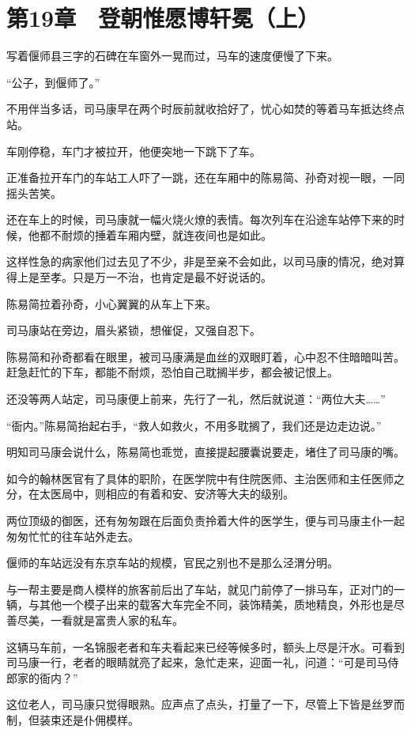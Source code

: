 \section{第19章　登朝惟愿博轩冕（上）}

写着偃师县三字的石碑在车窗外一晃而过，马车的速度便慢了下来。

“公子，到偃师了。”

不用伴当多话，司马康早在两个时辰前就收拾好了，忧心如焚的等着马车抵达终点站。

车刚停稳，车门才被拉开，他便突地一下跳下了车。

正准备拉开车门的车站工人吓了一跳，还在车厢中的陈易简、孙奇对视一眼，一同摇头苦笑。

还在车上的时候，司马康就一幅火烧火燎的表情。每次列车在沿途车站停下来的时候，他都不耐烦的捶着车厢内壁，就连夜间也是如此。

这样性急的病家他们过去见了不少，非是至亲不会如此，以司马康的情况，绝对算得上是至孝。只是万一不治，也肯定是最不好说话的。

陈易简拉着孙奇，小心翼翼的从车上下来。

司马康站在旁边，眉头紧锁，想催促，又强自忍下。

陈易简和孙奇都看在眼里，被司马康满是血丝的双眼盯着，心中忍不住暗暗叫苦。赶急赶忙的下车，都能不耐烦，恐怕自己耽搁半步，都会被记恨上。

还没等两人站定，司马康便上前来，先行了一礼，然后就说道：“两位大夫……”

“衙内。”陈易简抬起右手，“救人如救火，不用多耽搁了，我们还是边走边说。”

明知司马康会说什么，陈易简也乖觉，直接提起腰囊说要走，堵住了司马康的嘴。

如今的翰林医官有了具体的职阶，在医学院中有住院医师、主治医师和主任医师之分，在太医局中，则相应的有着和安、安济等大夫的级别。

两位顶级的御医，还有匆匆跟在后面负责拎着大件的医学生，便与司马康主仆一起匆匆忙忙的往车站外走去。

偃师的车站远没有东京车站的规模，官民之别也不是那么泾渭分明。

与一帮主要是商人模样的旅客前后出了车站，就见门前停了一排马车，正对门的一辆，与其他一个模子出来的载客大车完全不同，装饰精美，质地精良，外形也是尽善尽美，一看就是富贵人家的私车。

这辆马车前，一名锦服老者和车夫看起来已经等候多时，额头上尽是汗水。可看到司马康一行，老者的眼睛就亮了起来，急忙走来，迎面一礼，问道：“可是司马侍郎家的衙内？”

这位老人，司马康只觉得眼熟。应声点了点头，打量了一下，尽管上下皆是丝罗而制，但装束还是仆佣模样。

